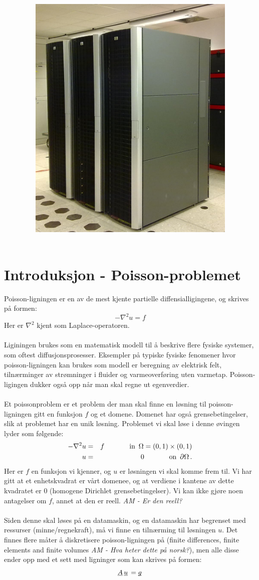 \documentclass{article}
\title{
\vspace*{\stretch{1}}
\noindent\HRule
\begin{center}
 \Huge
 \noindent	\exerciseClass \\
 \noindent \exerciseTitle \\ [4mm]
 \large
 \noindent\emph{\exerciseGroupMembers}
\noindent\HRule \newline
\end{center}
\vspace{0cm}
\begin{center}
	\includegraphics[width=10cm]{img/kongull.jpg}
\end{center}
\vspace*{\stretch{3}}
\begin{center}
\end{center}
}
\newcommand{\ub}[1]{\underbar{$#1$}\,}
\begin{document}
\pagestyle{empty}
\maketitle

\thispagestyle{empty}

\newpage \tableofcontents


\newpage


\section{Introduksjon - Poisson-problemet}
Poisson-ligningen er en av de mest kjente partielle diffensialligingene, og skrives på formen:
\begin{equation}
	-\nabla^2 u = f
\end{equation}
Her er $\nabla^2$ kjent som Laplace-operatoren.\\
\\
Liginingen brukes som en matematisk modell til å beskrive flere fysiske systemer, som oftest diffusjonsprosesser. Eksempler på typiske fysiske fenomener hvor poisson-ligningen kan brukes som modell er beregning av elektrisk felt, tilnærminger av strømninger i fluider og varmeoverføring uten varmetap. Poisson-ligingen dukker også opp når man skal regne ut egenverdier.\\
\\
Et poissonproblem er et problem der man skal finne en løsning til poisson-ligningen gitt en funksjon $f$ og et domene. Domenet har også grensebetingelser, slik at problemet har en unik løsning. Problemet vi skal løse i denne øvingen lyder som følgende:
\begin{eqnarray}
	-\nabla^2 u & = & f \hspace{.5in} \textrm{in} \,\,\, \Omega = (0,1)\times (0,1) \\
	u & = & 0 \hspace{.5in} \textrm{on} \,\,\, \partial\Omega\, .
\end{eqnarray}
Her er $f$ en funksjon vi kjenner,  og $u$ er løsningen vi skal komme frem til. Vi har gitt at et enhetskvadrat  er vårt domenee, og at verdiene i kantene av dette kvadratet er $0$ (homogene Dirichlet grensebetingelser). Vi kan ikke gjøre noen antagelser om $f$, annet at den er reell.
\emph{AM - Er den reell?}\\
\\
Siden denne skal løses på en datamaskin, og en datamaskin har begrenset med ressurser (minne/regnekraft), må vi finne en tilnærming til løsningen $u$. Det finnes flere måter å diskretisere poisson-ligningen på (finite differences, finite elements and finite volumes \emph{AM - Hva heter dette på norsk?}), men alle disse ender opp med et sett med ligninger som kan skrives på formen:
\begin{equation}
	\label{eq:linear-system}
  \ub{A} \ub{u} = \ub{g}
\end{equation}
\end{document}
